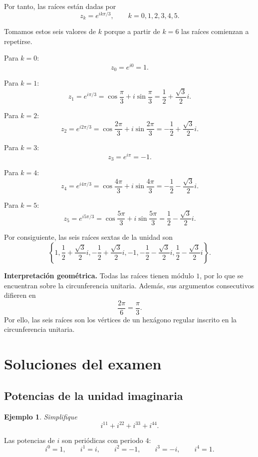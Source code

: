 \documentclass[12pt]{article}
\newtheorem{Ejem}{Ejemplo}
\begin{document}
Por tanto, las raíces están dadas por
\[
\boxed{
z_k=e^{ik\pi/3}
},
\qquad
k=0,1,2,3,4,5.
\]

Tomamos estos seis valores de $k$ porque a partir de $k=6$ las raíces
comienzan a repetirse.

Para $k=0$:
\[
z_0=e^{i0}=1.
\]

Para $k=1$:
\[
z_1=e^{i\pi/3}
=
\cos\frac{\pi}{3}
+i\sin\frac{\pi}{3}
=
\frac12+\frac{\sqrt3}{2}i.
\]

Para $k=2$:
\[
z_2=e^{i2\pi/3}
=
\cos\frac{2\pi}{3}
+i\sin\frac{2\pi}{3}
=
-\frac12+\frac{\sqrt3}{2}i.
\]

Para $k=3$:
\[
z_3=e^{i\pi}
=
-1.
\]

Para $k=4$:
\[
z_4=e^{i4\pi/3}
=
\cos\frac{4\pi}{3}
+i\sin\frac{4\pi}{3}
=
-\frac12-\frac{\sqrt3}{2}i.
\]

Para $k=5$:
\[
z_5=e^{i5\pi/3}
=
\cos\frac{5\pi}{3}
+i\sin\frac{5\pi}{3}
=
\frac12-\frac{\sqrt3}{2}i.
\]

Por consiguiente, las seis raíces sextas de la unidad son
\[
\boxed{
\left\{
1,
\frac12+\frac{\sqrt3}{2}i,
-\frac12+\frac{\sqrt3}{2}i,
-1,
-\frac12-\frac{\sqrt3}{2}i,
\frac12-\frac{\sqrt3}{2}i
\right\}
}.
\]

\medskip

\noindent
\textbf{Interpretación geométrica.}
Todas las raíces tienen módulo $1$, por lo que se encuentran sobre la
circunferencia unitaria. Además, sus argumentos consecutivos difieren en
\[
\frac{2\pi}{6}=\frac{\pi}{3}.
\]
Por ello, las seis raíces son los vértices de un hexágono regular inscrito
en la circunferencia unitaria.

\section{Soluciones del examen}

\subsection{Potencias de la unidad imaginaria}

\begin{Ejem}
Simplifique
\[
i^{11}+i^{22}+i^{33}+i^{44}.
\]
\end{Ejem}

Las potencias de $i$ son periódicas con periodo $4$:
\[
i^0=1,\qquad
i^1=i,\qquad
i^2=-1,\qquad
i^3=-i,\qquad
i^4=1.
\]
\end{document}
